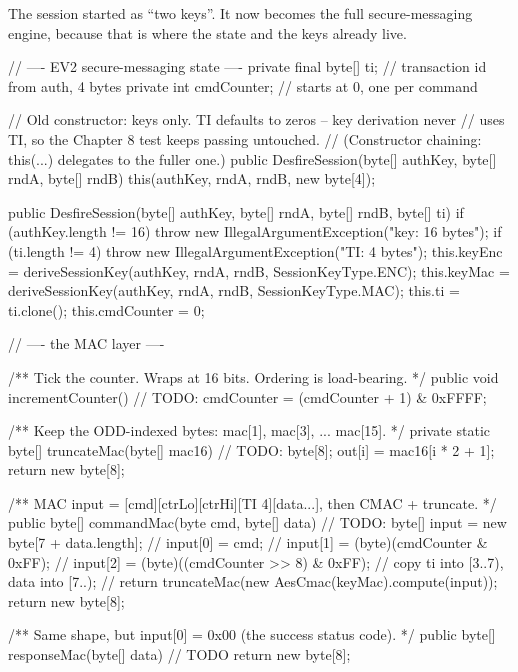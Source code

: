 The session started as ``two keys''. It now becomes the full secure-messaging
engine, because that is where the state and the keys already live.

\begin{jcode}
    // ---- EV2 secure-messaging state ----
    private final byte[] ti;   // transaction id from auth, 4 bytes
    private int cmdCounter;    // starts at 0, one per command

    // Old constructor: keys only. TI defaults to zeros -- key derivation never
    // uses TI, so the Chapter 8 test keeps passing untouched.
    // (Constructor chaining: this(...) delegates to the fuller one.)
    public DesfireSession(byte[] authKey, byte[] rndA, byte[] rndB) {
        this(authKey, rndA, rndB, new byte[4]);
    }

    public DesfireSession(byte[] authKey, byte[] rndA, byte[] rndB, byte[] ti) {
        if (authKey.length != 16) throw new IllegalArgumentException("key: 16 bytes");
        if (ti.length != 4)       throw new IllegalArgumentException("TI: 4 bytes");
        this.keyEnc = deriveSessionKey(authKey, rndA, rndB, SessionKeyType.ENC);
        this.keyMac = deriveSessionKey(authKey, rndA, rndB, SessionKeyType.MAC);
        this.ti = ti.clone();
        this.cmdCounter = 0;
    }

    // ---- the MAC layer ----

    /** Tick the counter. Wraps at 16 bits. Ordering is load-bearing. */
    public void incrementCounter() {
        // TODO: cmdCounter = (cmdCounter + 1) & 0xFFFF;
    }

    /** Keep the ODD-indexed bytes: mac[1], mac[3], ... mac[15]. */
    private static byte[] truncateMac(byte[] mac16) {
        // TODO: byte[8]; out[i] = mac16[i * 2 + 1];
        return new byte[8];
    }

    /** MAC input = [cmd][ctrLo][ctrHi][TI 4][data...], then CMAC + truncate. */
    public byte[] commandMac(byte cmd, byte[] data) {
        // TODO: byte[] input = new byte[7 + data.length];
        //       input[0] = cmd;
        //       input[1] = (byte)(cmdCounter & 0xFF);
        //       input[2] = (byte)((cmdCounter >> 8) & 0xFF);
        //       copy ti into [3..7), data into [7..);
        //       return truncateMac(new AesCmac(keyMac).compute(input));
        return new byte[8];
    }

    /** Same shape, but input[0] = 0x00 (the success status code). */
    public byte[] responseMac(byte[] data) {
        // TODO
        return new byte[8];
    }


\end{jcode}
